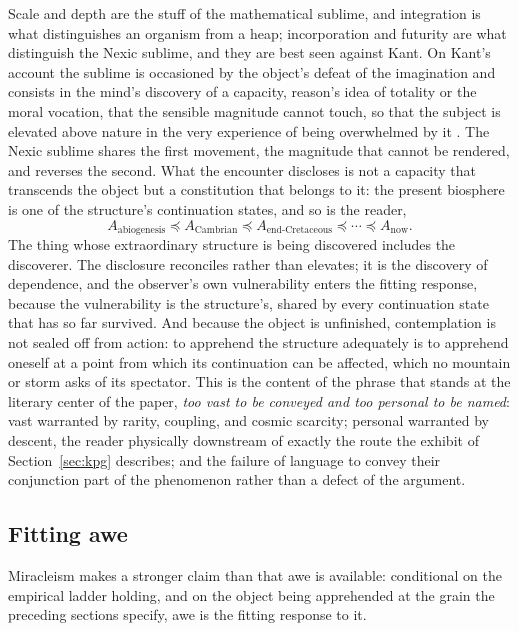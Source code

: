 \noindent Scale and depth are the stuff of the mathematical sublime, and
integration is what distinguishes an organism from a heap; incorporation and
futurity are what distinguish the Nexic sublime, and they are best seen
against Kant. On Kant's account the sublime is occasioned by the object's
defeat of the imagination and consists in the mind's discovery of a capacity, reason's
idea of totality or the moral vocation, that the sensible magnitude cannot
touch, so that the subject is elevated above nature in the very experience of
being overwhelmed by it \cite{Kant1790}. The Nexic sublime shares the first
movement, the magnitude that cannot be rendered, and reverses the second. What
the encounter discloses is not a capacity that transcends the object but a
constitution that belongs to it: the present biosphere is one of the
structure's continuation states, and so is the reader,
\[
A_{\mathrm{abiogenesis}}\preceq A_{\mathrm{Cambrian}}\preceq
A_{\mathrm{end\text{-}Cretaceous}}\preceq\cdots\preceq A_{\mathrm{now}}.
\]
The thing whose extraordinary structure is being discovered includes the
discoverer. The disclosure reconciles rather than elevates; it is the
discovery of dependence, and the observer's own vulnerability enters the
fitting response, because the vulnerability is the structure's, shared by
every continuation state that has so far survived. And because the object is
unfinished, contemplation is not sealed off from action: to apprehend the
structure adequately is to apprehend oneself at a point from which its
continuation can be affected, which no mountain or storm asks of its
spectator. This is the content of the phrase that stands at the literary
center of the paper, \emph{too vast to be conveyed and too personal to be
named}: vast warranted by rarity, coupling, and cosmic scarcity; personal
warranted by descent, the reader physically downstream of exactly the route
the exhibit of Section~\ref{sec:kpg} describes; and the failure of language
to convey their conjunction part of the phenomenon rather than a defect of
the argument.

\subsection*{Fitting awe}

Miracleism makes a stronger claim than that awe is available: conditional on
the empirical ladder holding, and on the object being apprehended at the grain
the preceding sections specify, awe is the fitting response to it.


